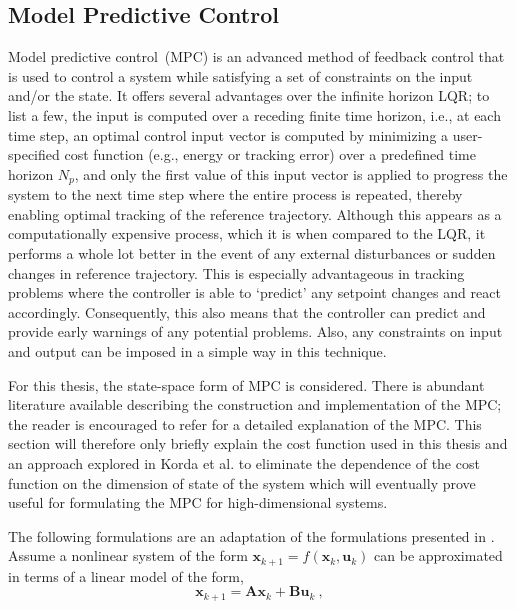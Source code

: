 \subsection{Model Predictive Control}
\label{sec: MPC}
Model predictive control~(MPC) is an advanced method of feedback control that is used to control a system while satisfying a set of constraints on the input and/or the state. It offers several advantages over the infinite horizon LQR; to list a few, the input is computed over a receding finite time horizon, i.e., at each time step, an optimal control input vector is computed by minimizing a user-specified cost function (e.g., energy or tracking error) over a predefined time horizon $N_p$, and only the first value of this input vector is applied to progress the system to the next time step where the entire process is repeated, thereby enabling optimal tracking of the reference trajectory.  Although this appears as a computationally expensive process, which it is when compared to the LQR, it performs a whole lot better in the event of any external disturbances or sudden changes in reference trajectory. This is especially advantageous in tracking problems where the controller is able to `predict' any setpoint changes and react accordingly. Consequently, this also means that the controller can predict and provide early warnings of any potential problems. Also, any constraints on input and output can be imposed in a simple way in this technique.\par
For this thesis, the state-space form of MPC is considered. There is abundant literature available describing the construction and implementation of the MPC; the reader is encouraged to refer \cite{MPCbook} for a detailed explanation of the MPC. This section will therefore only briefly explain the cost function used in this thesis and an approach explored in Korda et al. \cite{MPC_Korda} to eliminate the dependence of the cost function on the dimension of state of the system which will eventually prove useful for formulating the MPC for high-dimensional systems. \par 
The following formulations are an adaptation of the formulations presented in \cite{MPC_Korda}.\\
Assume a nonlinear system of the form $\mathbf{x}_{k+1} = f(\mathbf{x}_k,\mathbf{u}_k)$ can be approximated in terms of a linear model of the form,
\begin{equation}
\label{eq:MPCdisc}
    \mathbf{x}_{k+1} = \mathbf{Ax}_k + \textbf{Bu}_k \:,
\end{equation}
